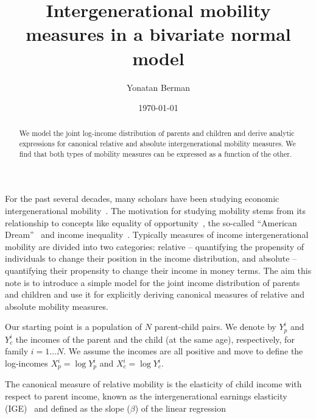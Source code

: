 \documentclass[prl,amsmath,twocolumn,nofootinbib]{revtex4}
\numberwithin{equation}{section}
\begin{document}
\title{Intergenerational mobility measures in a bivariate normal model}
% 
\author{Yonatan Berman}

\date{\today}

\begin{abstract} 
We model the joint log-income distribution of parents and children and derive analytic expressions for canonical relative and absolute intergenerational mobility measures. We find that both types of mobility measures can be expressed as a function of the other.
\end{abstract}

\maketitle

For the past several decades, many scholars have been studying economic intergenerational mobility~\cite{mazumder2005fortunate,aaronson2008intergenerational,lee2009trends,hauser2010intergenerational,corak2013income,chetty2014united}. The motivation for studying mobility stems from its relationship to concepts like equality of opportunity~\cite{roemer2000opportunity,chetty2014land}, the so-called ``American Dream''~\cite{corak2009chasing,chetty2017fading} and income inequality~\cite{corak2013income,berman2016understanding}. Typically measures of income intergenerational mobility are divided into two categories: relative -- quantifying the propensity of individuals to change their position in the income distribution, and absolute -- quantifying their propensity to change their income in money terms. The aim this note is to introduce a simple model for the joint income distribution of parents and children and use it for explicitly deriving canonical measures of relative and absolute mobility measures.

Our starting point is a population of $N$ parent-child pairs. We denote by $Y_p^i$ and $Y_c^i$ the incomes of the parent and the child (at the same age), respectively, for family $i=1\dots N$. We assume the incomes are all positive and move to define the log-incomes $X_p^i=\log Y_p^i$ and $X_c^i=\log Y_c^i$.

The canonical measure of relative mobility is the elasticity of child income with respect to parent income, known as the intergenerational earnings elasticity (IGE)~\cite{mulligan1997parental,lee2009trends,chetty2014land} and defined as the slope ($\beta$) of the linear regression
\end{document}
